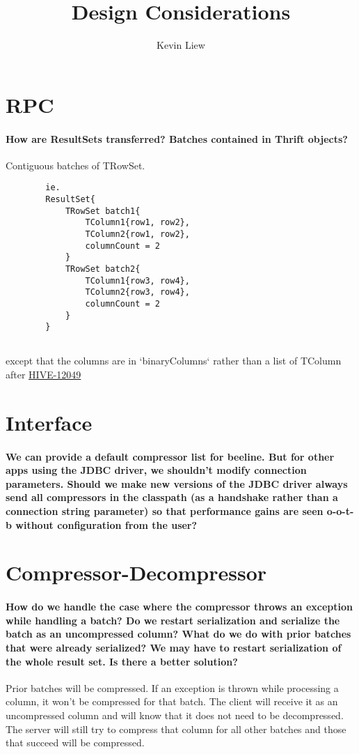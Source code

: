 \documentclass[11pt,a4paper]{article}
\title{Design Considerations}
\author{Kevin Liew}
\begin{document}
\maketitle

\section{RPC}
	\paragraph{How are ResultSets transferred? Batches contained in Thrift objects?}
	Contiguous batches of TRowSet.
	\begin{verbatim}
		ie.
		ResultSet{
		    TRowSet batch1{
		        TColumn1{row1, row2},
		        TColumn2{row1, row2},
		        columnCount = 2
		    }
		    TRowSet batch2{
		        TColumn1{row3, row4},
		        TColumn2{row3, row4},
		        columnCount = 2
		    }
		}
		
	\end{verbatim}
	except that the columns are in `binaryColumns` rather than a list of TColumn after \href{https://issues.apache.org/jira/browse/HIVE-12049}{HIVE-12049}

\section{Interface}
	\paragraph{We can provide a default compressor list for beeline. But for other apps using the JDBC driver, we shouldn't modify connection parameters. Should we make new versions of the JDBC driver always send all compressors in the classpath (as a handshake rather than a connection string parameter) so that performance gains are seen o-o-t-b without configuration from the user?}

\section{Compressor-Decompressor}
	\paragraph{How do we handle the case where the compressor throws an exception while handling a batch? Do we restart serialization and serialize the batch as an uncompressed column? What do we do with prior batches that were already serialized? We may have to restart serialization of the whole result set. Is there a better solution?}
	Prior batches will be compressed. If an exception is thrown while processing a column, it won't be compressed for that batch. The client will receive it as an uncompressed column and will know that it does not need to be decompressed. The server will still try to compress that column for all other batches and those that succeed will be compressed.
	
\end{document}
